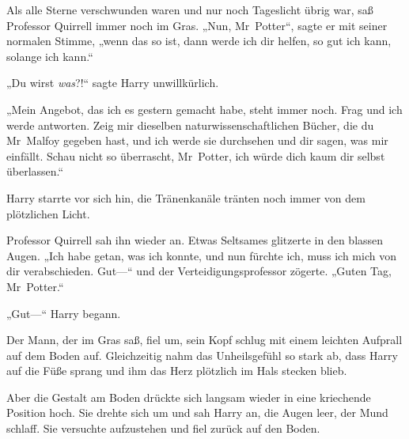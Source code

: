 Als alle Sterne verschwunden waren und nur noch Tageslicht übrig war, saß Professor Quirrell immer noch im Gras.
„Nun, Mr~Potter“, sagte er mit seiner normalen Stimme, „wenn das so ist, dann werde ich dir helfen, so gut ich kann, solange ich kann.“

„Du wirst \emph{was}?!“ sagte Harry unwillkürlich.

„Mein Angebot, das ich es gestern gemacht habe, steht immer noch. Frag und ich werde antworten. Zeig mir dieselben naturwissenschaftlichen Bücher, die du Mr~Malfoy gegeben hast, und ich werde sie durchsehen und dir sagen, was mir einfällt. Schau nicht so überrascht, Mr~Potter, ich würde dich kaum dir selbst überlassen.“

Harry starrte vor sich hin, die Tränenkanäle tränten noch immer von dem plötzlichen Licht.

Professor Quirrell sah ihn wieder an. Etwas Seltsames glitzerte in den blassen Augen. „Ich habe getan, was ich konnte, und nun fürchte ich, muss ich mich von dir verabschieden. Gut—“ und der Verteidigungsprofessor zögerte. „Guten Tag, Mr~Potter.“

„Gut—“ Harry begann.

Der Mann, der im Gras saß, fiel um, sein Kopf schlug mit einem leichten Aufprall auf dem Boden auf. Gleichzeitig nahm das Unheilsgefühl so stark ab, dass Harry auf die Füße sprang und ihm das Herz plötzlich im Hals stecken blieb.

Aber die Gestalt am Boden drückte sich langsam wieder in eine kriechende Position hoch. Sie drehte sich um und sah Harry an, die Augen leer, der Mund schlaff. Sie versuchte aufzustehen und fiel zurück auf den Boden.

